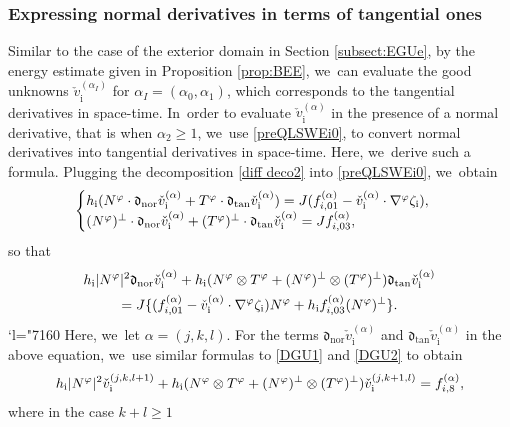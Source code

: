 \documentclass[11pt]{article}
\newcommand{\Changel}{\mathcode`l="7160}
\newcommand{\dtan}{{\mathfrak d}_\mathrm{tan}}
\newcommand{\dnor}{{\mathfrak d}_\mathrm{nor}}
\theoremstyle{definition}
\begin{document}
\subsubsection{Expressing normal derivatives in terms of tangential ones}
Similar to the case of the exterior domain in Section \ref{subsect:EGUe}, by the energy estimate given in Proposition \ref{prop:BEE}, we~can evaluate the good unknowns $\check{v}_\mathrm{i}^{(\alpha_I)}$ for $\alpha_I=(\alpha_0,\alpha_1)$,
which corresponds to the tangential derivatives in space-time. In~order to evaluate $\check{v}_\mathrm{i}^{(\alpha)}$ in the presence of a normal derivative, that is when $\alpha_2\geq 1$, we~use \eqref{preQLSWEi0},
to convert normal derivatives into tangential derivatives in space-time.
Here, we~derive such a formula.
Plugging the decomposition \eqref{diff deco2} into \eqref{preQLSWEi0}, we~obtain
\[
\begin{cases}
h_\mathrm{i}(N^\varphi\cdot\dnor\check{v}_\mathrm{i}^{(\alpha)} + T^\varphi\cdot\dtan\check{v}_\mathrm{i}^{(\alpha)})
= J(f_{{\rm i}, 01}^{(\alpha)} - \check{v}_\mathrm{i}^{(\alpha)}\cdot\nabla^\varphi\zeta_\mathrm{i}), \\
(N^\varphi)^\perp\cdot\dnor\check{v}_\mathrm{i}^{(\alpha)} + (T^\varphi)^\perp\cdot\dtan\check{v}_\mathrm{i}^{(\alpha)} = Jf_{{\rm i},03}^{(\alpha)},
\end{cases}
\]
so that
\begin{multline*}
h_\mathrm{i}|N^\varphi|^2\dnor\check{v}_\mathrm{i}^{(\alpha)}
+ h_\mathrm{i}(N^\varphi\otimes T^\varphi + (N^\varphi)^\perp\otimes(T^\varphi)^\perp)\dtan\check{v}_\mathrm{i}^{(\alpha)} \\
= J\{ (f_{{\rm i}, 01}^{(\alpha)} - \check{v}_\mathrm{i}^{(\alpha)}\cdot\nabla^\varphi\zeta_\mathrm{i})N^\varphi
+ h_\mathrm{i }f_{{\rm i},03}^{(\alpha)}(N^\varphi)^\perp \}.
\end{multline*}%
\Changel%
Here, we~let $\alpha=(j,k,l)$.
For the terms $\dnor\check{v}_\mathrm{i}^{(\alpha)}$ and $\dtan\check{v}_\mathrm{i}^{(\alpha)}$ in the above equation, we~use similar formulas to \eqref{DGU1} and \eqref{DGU2} to obtain
\begin{equation}\label{QLSWEi2}
h_\mathrm{i}|N^\varphi|^2\check{v}_\mathrm{i}^{(j,k,l+1)}
+ h_\mathrm{i}(N^\varphi\otimes T^\varphi + (N^\varphi)^\perp\otimes(T^\varphi)^\perp)\check{v}_\mathrm{i}^{(j,k+1,l)} = f_{{\rm i},8}^{(\alpha)},
\end{equation}
where in the case $k+l\geq1$
\end{document}
